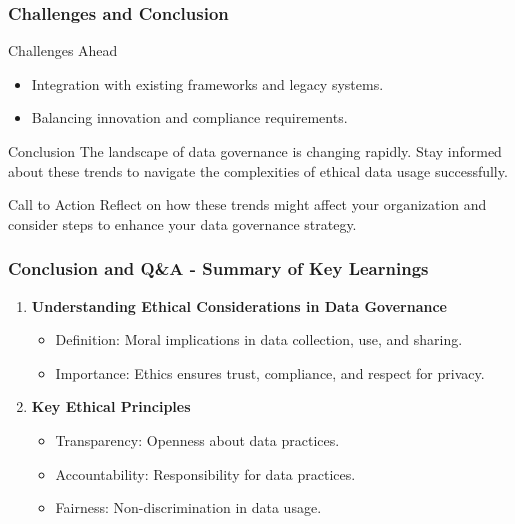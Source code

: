 \documentclass[aspectratio=169]{beamer}
\begin{document}
\begin{frame}[fragile]
    \frametitle{Challenges and Conclusion}
    \begin{block}{Challenges Ahead}
        \begin{itemize}
            \item Integration with existing frameworks and legacy systems.
            \item Balancing innovation and compliance requirements.
        \end{itemize}
    \end{block}

    \begin{block}{Conclusion}
        The landscape of data governance is changing rapidly. Stay informed about these trends to navigate the complexities of ethical data usage successfully.
    \end{block}
    
    \begin{block}{Call to Action}
        Reflect on how these trends might affect your organization and consider steps to enhance your data governance strategy.
    \end{block}
\end{frame}

\begin{frame}[fragile]
    \frametitle{Conclusion and Q\&A - Summary of Key Learnings}
    \begin{enumerate}
        \item \textbf{Understanding Ethical Considerations in Data Governance}
            \begin{itemize}
                \item Definition: Moral implications in data collection, use, and sharing.
                \item Importance: Ethics ensures trust, compliance, and respect for privacy.
            \end{itemize}
        
        \item \textbf{Key Ethical Principles}
            \begin{itemize}
                \item Transparency: Openness about data practices.
                \item Accountability: Responsibility for data practices.
                \item Fairness: Non-discrimination in data usage.
            \end{itemize}
    \end{enumerate}
\end{frame}
\end{document}
